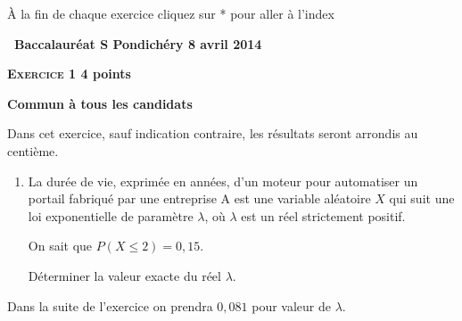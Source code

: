 \documentclass[10pt]{article}
\begin{document}
À la fin de chaque exercice cliquez sur * pour aller \`a l'index
\newpage ~
\newpage
\hypertarget{Pondichery}{}

\renewcommand \footrulewidth{.2pt}
\pagestyle{fancy}
\thispagestyle{empty}

\begin{center}{\Large\textbf{\decofourleft~Baccalauréat S Pondichéry  8 avril 2014~\decofourright}}
\end{center}

\vspace{0,25cm}

\textbf{\textsc{Exercice 1} \hfill 4 points}
 
\textbf{Commun  à tous les candidats}

\medskip

Dans cet exercice, sauf indication contraire, les résultats seront arrondis au centième.

\medskip
 
\begin{enumerate}
\item La durée de vie, exprimée en années, d'un moteur pour automatiser un portail fabriqué par une entreprise A est une variable aléatoire $X$ qui suit une loi exponentielle de paramètre $\lambda$, où $\lambda$ est un réel strictement positif. 

On sait que $P(X \leqslant 2) = 0,15$.

Déterminer la valeur exacte du réel $\lambda$.

\medskip

\end{enumerate}

Dans la suite de l'exercice on prendra $0,081$ pour valeur de $\lambda$. 

\medskip
\end{document}
